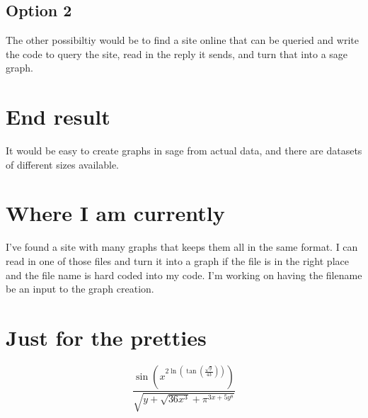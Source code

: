 \documentclass{article}
\begin{document}
\subsection{Option 2}
The other possibiltiy would be to find a site online that can be queried and write the code to query the site, read in the reply it sends, and turn that into a sage graph.
\section{End result}
It would be easy to create graphs in sage from actual data, and there are datasets of different sizes available.
\section{Where I am currently}
I've found a site with many graphs that keeps them all in the same format. I can read in one of those files and turn it into a graph if the file is in the right place and the file name is hard coded into my code. I'm working on having the filename be an input to the graph creation.
\section{Just for the pretties}
$$\frac{\sin{\left(x^{2\ln{\left(\tan{\left(\frac{\sqrt{y}}{43}\right)}\right)}}\right)}}{\sqrt{y+\sqrt{36x^3} + \pi^{3x+5y^8}}}$$
\end{document}
